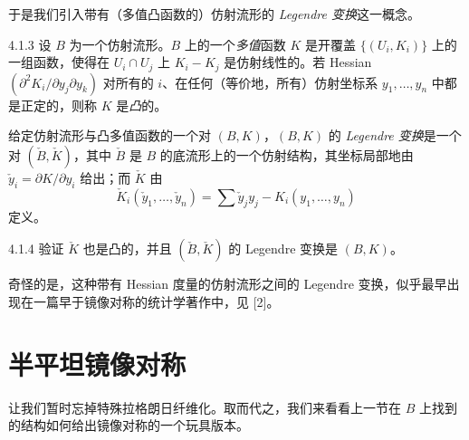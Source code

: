 于是我们引入带有（多值凸函数的）仿射流形的 \emph{Legendre 变换}这一概念。

\begin{definition}{4.1.3}
设 $B$ 为一个仿射流形。$B$ 上的一个\emph{多值}函数 $K$ 是开覆盖 $\{(U_i,K_i)\}$ 上的一组函数，使得在 $U_i\cap U_j$ 上 $K_i-K_j$ 是仿射线性的。若 Hessian $(\partial^2K_i/\partial y_j\partial y_k)$ 对所有的 $i$、在任何（等价地，所有）仿射坐标系 $y_1,\dots,y_n$ 中都是正定的，则称 $K$ 是\emph{凸}的。
\end{definition}

给定仿射流形与凸多值函数的一个对 $(B,K)$，$(B,K)$ 的 \emph{Legendre 变换}是一个对 $(\check B,\check K)$，其中 $\check B$ 是 $B$ 的底流形上的一个仿射结构，其坐标局部地由 $\check y_i=\partial K/\partial y_i$ 给出；而 $\check K$ 由
\[
\check K_i(\check y_1,\dots,\check y_n)=\sum \check y_jy_j-K_i(y_1,\dots,y_n)
\]
定义。

\begin{exercise}{4.1.4}
验证 $\check K$ 也是凸的，并且 $(\check B,\check K)$ 的 Legendre 变换是 $(B,K)$。
\end{exercise}

奇怪的是，这种带有 Hessian 度量的仿射流形之间的 Legendre 变换，似乎最早出现在一篇早于镜像对称的统计学著作中，见 [2]。

\section{半平坦镜像对称}
让我们暂时忘掉特殊拉格朗日纤维化。取而代之，我们来看看上一节在 $B$ 上找到的结构如何给出镜像对称的一个玩具版本。

